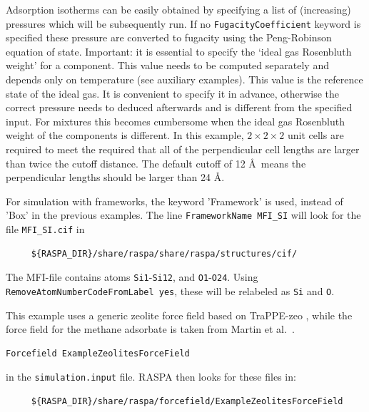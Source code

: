 Adsorption isotherms can be easily obtained by specifying a list of (increasing) pressures which will be subsequently run.
If no \verb+FugacityCoefficient+ keyword is specified these pressure are converted to fugacity using the Peng-Robinson equation of state.
Important: it is essential to specify the `ideal gas Rosenbluth weight' for a component. This value needs to be computed separately
and depends only on temperature (see auxiliary examples). This value is the reference state of the ideal gas. It is convenient to specify
it in advance, otherwise the correct pressure needs to deduced afterwards and is different from the specified input. For mixtures this
becomes cumbersome when the ideal gas Rosenbluth weight of the components is different. 
In this example, $2\times2\times2$ unit cells are required to meet the required that all of the perpendicular cell lengths are larger than 
twice the cutoff distance. The default cutoff of 12 \AA\ means the perpendicular lengths should be larger than 24 \AA.

For simulation with frameworks, the keyword 'Framework' is used, instead of 'Box' in the previous examples.
The line \verb+FrameworkName MFI_SI+ will look for the file \verb+MFI_SI.cif+ in
\begin{verbatim}
     ${RASPA_DIR}/share/raspa/share/raspa/structures/cif/
\end{verbatim}
The MFI-file contains atoms \verb+Si1+-\verb+Si12+, and \verb+O1+-\verb+O24+.
Using \verb+RemoveAtomNumberCodeFromLabel yes+, these will be relabeled as \verb+Si+ and \verb+O+.

This example uses a generic zeolite force field based on TraPPE-zeo \cite{Bai2013}, while
the force field for the methane adsorbate is taken from Martin et al.\ \cite{Martin2001}.
\begin{verbatim}
Forcefield ExampleZeolitesForceField
\end{verbatim}
in the \verb+simulation.input+ file.
RASPA then looks for these files in:
\begin{verbatim}
     ${RASPA_DIR}/share/raspa/forcefield/ExampleZeolitesForceField
\end{verbatim}

